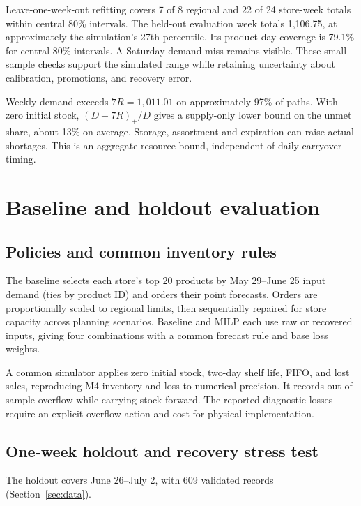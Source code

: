 \documentclass[11pt,letterpaper]{article}
\begin{document}
Leave-one-week-out refitting covers 7 of 8 regional and 22 of 24 store-week totals
within central 80\% intervals. The held-out evaluation week totals 1,106.75,
at approximately the simulation's 27th percentile. Its product-day coverage is
79.1\% for central 80\% intervals. A Saturday demand miss remains visible.
These small-sample checks support the simulated range while retaining
uncertainty about calibration, promotions, and recovery error.

Weekly demand exceeds $7R=1{,}011.01$ on approximately 97\% of paths. With zero
initial stock, $(D-7R)_+/D$ gives a supply-only lower bound on the unmet share,
about 13\% on average. Storage, assortment and expiration can raise actual shortages.
This is an aggregate resource bound, independent of daily carryover timing.

\clearpage
\section{Baseline and holdout evaluation}
\subsection{Policies and common inventory rules}
The baseline selects each store's top 20 products by May 29--June 25 input demand
(ties by product ID) and orders their point forecasts. Orders are proportionally
scaled to regional limits, then sequentially repaired for store capacity across
planning scenarios. Baseline and MILP each use raw or recovered inputs, giving
four combinations with a common forecast rule and base loss weights.

A common simulator applies zero initial stock, two-day shelf life, FIFO, and lost
sales, reproducing M4 inventory and loss to numerical precision. It records
out-of-sample overflow while carrying stock forward. The reported diagnostic
losses require an explicit overflow action and cost for physical implementation.

\subsection{One-week holdout and recovery stress test}
The holdout covers June 26--July 2, with 609 validated records (Section~\ref{sec:data}).
\end{document}

